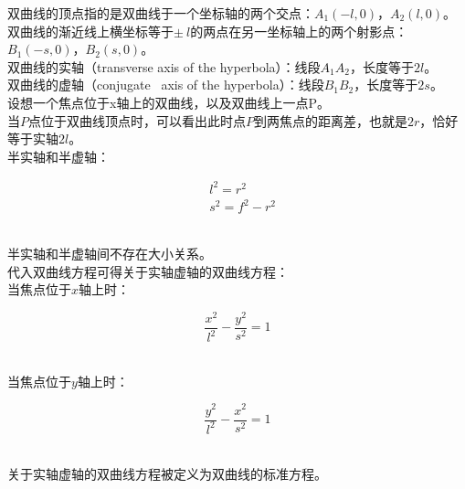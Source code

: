 \documentclass[UTF8]{ctexart}
\begin{document}
    双曲线的顶点指的是双曲线于一个坐标轴的两个交点：$A_1(-l,0)$，$A_2(l,0)$。\\[3mm]
    双曲线的渐近线上横坐标等于$\pm~l$的两点在另一坐标轴上的两个射影点：$B_1(-s,0)$，$B_2(s,0)$。\\[3mm]
    双曲线的实轴（transverse axis of the hyperbola）：线段$A_1A_2$，长度等于$2l$。\\[1mm]
    双曲线的虚轴（conjugate~ axis of the hyperbola）：线段$B_1B_2$\;，长度等于$2s$。\\[3mm]
    设想一个焦点位于x轴上的双曲线，以及双曲线上一点P。\\[1mm]
    当$P$点位于双曲线顶点时，可以看出此时点$P$到两焦点的距离差，也就是$2r$，恰好等于实轴$2l$。\\[3mm]
    半实轴和半虚轴：
    \begin{large}
        \begin{align*}
            &l^2=r^2\\[3mm]
            &s^2=f^2-r^2
        \end{align*}
    \end{large}\\
    半实轴和半虚轴间不存在大小关系。\\[6mm]
    代入双曲线方程可得关于实轴虚轴的双曲线方程：\\[3mm]
    当焦点位于$x$轴上时：
    \begin{large}
        \begin{equation*}
            \frac{x^2}{l^2}-\frac{y^2}{s^2}=1
        \end{equation*}
    \end{large}\\
    当焦点位于$y$轴上时：
    \begin{large}
        \begin{equation*}
            \frac{y^2}{l^2}-\frac{x^2}{s^2}=1
        \end{equation*}
    \end{large}\\
    关于实轴虚轴的双曲线方程被定义为双曲线的标准方程。

\newpage
\end{document}
